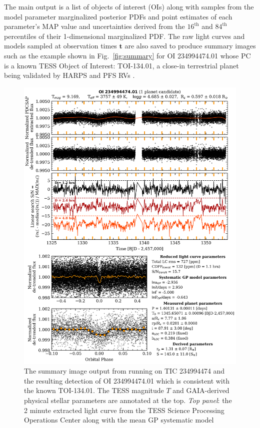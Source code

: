 The main \pipeline{} output is a list of objects of interest (OIs)
along with samples from the model parameter marginalized
posterior PDFs and point estimates of each parameter's MAP value and uncertainties derived from the
$16^{\text{th}}$ and $84^{\text{th}}$ percentiles of their 1-dimensional marginalized PDF.
The raw light curves and models
sampled at observation times $\mathbf{t}$ are also saved to produce summary images 
such as the example shown in Fig.~\ref{fig:summary} for OI 234994474.01  
whose PC is a known TESS Object of Interest: TOI-134.01, a close-in terrestrial planet being validated
by HARPS and PFS RVs \citep{astudillodefru19}.


\begin{figure}
  \centering
  \includegraphics[width=0.8\hsize]{figures/planetcandidatesummary_1_234994474.png}
  \caption[Summary output for TIC 234994474 from \texttt{ORION}.]
      {The summary image output from running \pipeline{} on TIC 234994474 and the resulting
    detection of OI 234994474.01 which is consistent with the known TOI-134.01. The TESS
    magnitude $T$ and GAIA-derived physical stellar parameters 
    are annotated at the top. \emph{Top panel}: the 2 minute extracted light curve from
    the TESS Science Processing Operations Center along with the mean GP systematic model
}
\end{figure}
